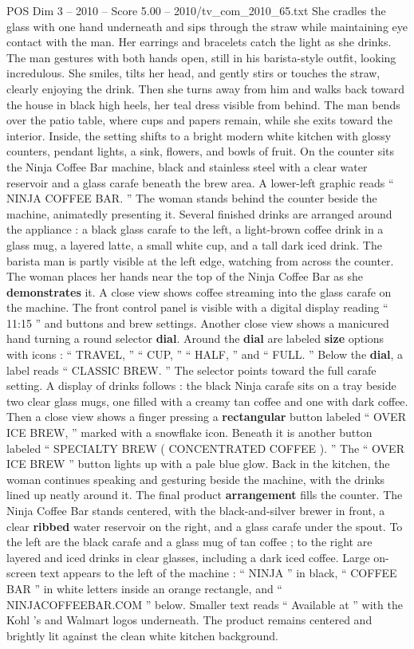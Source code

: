 \begin{textsample}{POS Dim 3 – 2010 – Score 5.00 – 2010/tv\_com\_2010\_65.txt}
She cradles the glass with one hand underneath and sips through the straw while maintaining eye contact with the man.
Her earrings and bracelets catch the light as she drinks.
The man gestures with both hands open, still in his barista-style outfit, looking incredulous.
She smiles, tilts her head, and gently stirs or touches the straw, clearly enjoying the drink.
Then she turns away from him and walks back toward the house in black high heels, her teal dress visible from behind.
The man bends over the patio table, where cups and papers remain, while she exits toward the interior.
Inside, the setting shifts to a bright modern white kitchen with glossy counters, pendant lights, a sink, flowers, and bowls of fruit.
On the counter sits the Ninja Coffee Bar machine, black and stainless steel with a clear water reservoir and a glass carafe beneath the brew area.
A lower-left graphic reads “ NINJA COFFEE BAR. ” The woman stands behind the counter beside the machine, animatedly presenting it.
Several finished drinks are arranged around the appliance : a black glass carafe to the left, a light-brown coffee drink in a glass mug, a layered latte, a small white cup, and a tall dark iced drink.
The barista man is partly visible at the left edge, watching from across the counter.
The woman places her hands near the top of the Ninja Coffee Bar as she \textbf{demonstrates} it.
A close view shows coffee streaming into the glass carafe on the machine.
The front control panel is visible with a digital display reading “ 11:15 ” and buttons and brew settings.
Another close view shows a manicured hand turning a round selector \textbf{dial}.
Around the \textbf{dial} are labeled \textbf{size} options with icons : “ TRAVEL, ” “ CUP, ” “ HALF, ” and “ FULL. ” Below the \textbf{dial}, a label reads “ CLASSIC BREW. ” The selector points toward the full carafe setting.
A display of drinks follows : the black Ninja carafe sits on a tray beside two clear glass mugs, one filled with a creamy tan coffee and one with dark coffee.
Then a close view shows a finger pressing a \textbf{rectangular} button labeled “ OVER ICE BREW, ” marked with a snowflake icon.
Beneath it is another button labeled “ SPECIALTY BREW ( CONCENTRATED COFFEE ). ” The “ OVER ICE BREW ” button lights up with a pale blue glow.
Back in the kitchen, the woman continues speaking and gesturing beside the machine, with the drinks lined up neatly around it.
The final product \textbf{arrangement} fills the counter.
The Ninja Coffee Bar stands centered, with the black-and-silver brewer in front, a clear \textbf{ribbed} water reservoir on the right, and a glass carafe under the spout.
To the left are the black carafe and a glass mug of tan coffee ; to the right are layered and iced drinks in clear glasses, including a dark iced coffee.
Large on-screen text appears to the left of the machine : “ NINJA ” in black, “ COFFEE BAR ” in white letters inside an orange rectangle, and “ NINJACOFFEEBAR.COM ” below.
Smaller text reads “ Available at ” with the Kohl ’s and Walmart logos underneath.
The product remains centered and brightly lit against the clean white kitchen background.

\end{textsample}
